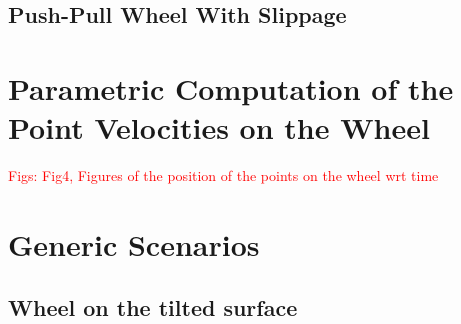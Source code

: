 \documentclass[letterpaper, 10pt, conference]{ieeeconf}
\begin{document}
\subsection{Push-Pull Wheel With Slippage}


\section{Parametric Computation of the Point Velocities on the Wheel}
\textcolor{red}{Figs: Fig4, Figures of the position of the points on the wheel wrt time}
\section{Generic Scenarios}
\subsection{Wheel on the tilted surface}
\end{document}
